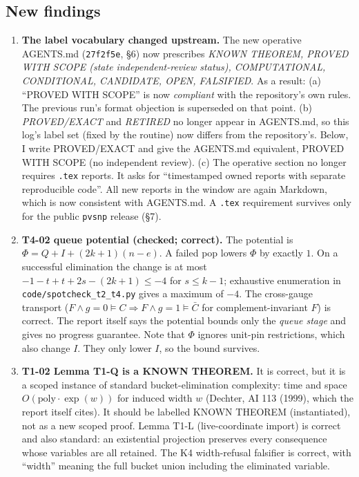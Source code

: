 \documentclass[11pt]{article}
\theoremstyle{definition}
\begin{document}
\subsection*{New findings}
\begin{enumerate}
\item \textbf{The label vocabulary changed upstream.} The new operative AGENTS.md (\texttt{27f2f5e}, \S6) now prescribes \emph{KNOWN THEOREM, PROVED WITH SCOPE (state independent-review status), COMPUTATIONAL, CONDITIONAL, CANDIDATE, OPEN, FALSIFIED}. As a result:
 (a) ``PROVED WITH SCOPE'' is now \emph{compliant} with the repository's own rules. The previous run's format objection is superseded on that point.
 (b) \emph{PROVED/EXACT} and \emph{RETIRED} no longer appear in AGENTS.md, so this log's label set (fixed by the routine) now differs from the repository's. Below, I write PROVED/EXACT and give the AGENTS.md equivalent, PROVED WITH SCOPE (no independent review).
 (c) The operative section no longer requires \texttt{.tex} reports. It asks for ``timestamped owned reports with separate reproducible code''. All new reports in the window are again Markdown, which is now consistent with AGENTS.md. A \texttt{.tex} requirement survives only for the public \texttt{pvsnp} release (\S7).
\item \textbf{T4-02 queue potential (checked; correct).} The potential is $\Phi=Q+I+(2k+1)(n-e)$. A failed pop lowers $\Phi$ by exactly $1$. On a successful elimination the change is at most $-1-t+t+2s-(2k+1)\le-4$ for $s\le k-1$; exhaustive enumeration in \texttt{code/spotcheck\_t2\_t4.py} gives a maximum of $-4$. The cross-gauge transport ($F\wedge g{=}0\models C\Rightarrow F\wedge g{=}1\models\bar C$ for complement-invariant $F$) is correct. The report itself says the potential bounds only the \emph{queue stage} and gives no progress guarantee. Note that $\Phi$ ignores unit-pin restrictions, which also change $I$. They only lower $I$, so the bound survives.
\item \textbf{T1-02 Lemma T1-Q is a KNOWN THEOREM.} It is correct, but it is a scoped instance of standard bucket-elimination complexity: time and space $O(\mathrm{poly}\cdot\exp(w))$ for induced width $w$ (Dechter, AI 113 (1999), which the report itself cites). It should be labelled KNOWN THEOREM (instantiated), not as a new scoped proof. Lemma T1-L (live-coordinate import) is correct and also standard: an existential projection preserves every consequence whose variables are all retained. The K4 width-refusal falsifier is correct, with ``width'' meaning the full bucket union including the eliminated variable.

\end{enumerate}
\end{document}
